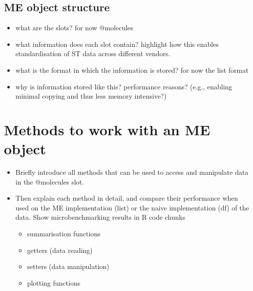 \documentclass[
]{article}
\providecommand{\tightlist}{%
  \setlength{\itemsep}{0pt}\setlength{\parskip}{0pt}}
\begin{document}
\hypertarget{me-object-structure}{%
\subsection{ME object structure}\label{me-object-structure}}

\begin{itemize}
\item
  what are the slots? for now @molecules
\item
  what information does each slot contain? highlight how this enables
  standardisation of ST data across different vendors.
\item
  what is the format in which the information is stored? for now the
  list format
\item
  why is information stored like this? performance reasons? (e.g.,
  enabling minimal copying and thus less memory intensive?)
\end{itemize}

\hypertarget{methods-to-work-with-an-me-object}{%
\section{Methods to work with an ME
object}\label{methods-to-work-with-an-me-object}}

\begin{itemize}
\tightlist
\item
  Briefly introduce all methods that can be used to access and
  manipulate data in the @molecules slot.
\item
  Then explain each method in detail, and compare their performance when
  used on the ME implementation (list) or the naive implementation (df)
  of the data. Show microbenchmarking results in R code chunks

  \begin{itemize}
  \tightlist
  \item
    summarisation functions
  \item
    getters (data reading)
  \item
    setters (data manipulation)
  \item
    plotting functions
  \end{itemize}
\end{itemize}
\end{document}
